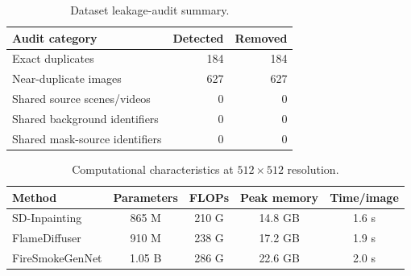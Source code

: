 \begin{table}[t]
\centering
\caption{Dataset leakage-audit summary.}
\label{tab:leakage_audit_results}
\begin{tabular}{lrr}
\toprule
Audit category & Detected & Removed \\
\midrule
Exact duplicates & 184 & 184 \\
Near-duplicate images & 627 & 627 \\
Shared source scenes/videos & 0 & 0 \\
Shared background identifiers & 0 & 0 \\
Shared mask-source identifiers & 0 & 0 \\
\bottomrule
\end{tabular}
\end{table}

\begin{table}[t]
\centering
\caption{Computational characteristics at $512\times512$ resolution.}
\label{tab:computational_characteristics}
\begin{tabular}{lcccc}
\toprule
Method & Parameters & FLOPs & Peak memory & Time/image \\
\midrule
SD-Inpainting & 865 M & 210 G & 14.8 GB & 1.6 s \\
FlameDiffuser & 910 M & 238 G & 17.2 GB & 1.9 s \\
FireSmokeGenNet & 1.05 B & 286 G & 22.6 GB & 2.0 s \\
\bottomrule
\end{tabular}
\end{table}
